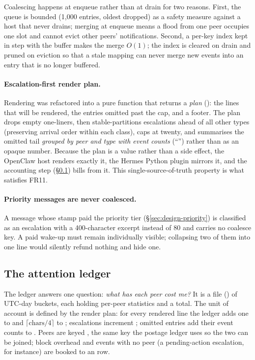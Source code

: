 Coalescing happens at enqueue rather than at drain for two reasons. First, the queue is
bounded (1{,}000 entries, oldest dropped) as a safety measure against a host that never
drains; merging at enqueue means a flood from one peer occupies one slot and cannot evict
other peers' notifications. Second, a per-key index kept in step with the buffer makes
the merge $O(1)$; the index is cleared on drain and pruned on eviction so that a stale
mapping can never merge new events into an entry that is no longer buffered.

\paragraph{Escalation-first render plan.}
Rendering was refactored into a pure function that returns a \emph{plan}
(): the lines that will be rendered, the entries omitted
past the cap, and a footer. The plan drops empty one-liners, then stable-partitions escalations ahead of all
other types (preserving arrival order within each class), caps at twenty, and summarises
the omitted tail \emph{grouped by peer and type with event counts}
(``'') rather than as an opaque
number. Because the plan is a value rather than a side effect, the OpenClaw host renders
exactly it, the Hermes Python plugin mirrors it, and the accounting step
(\S\ref{sec:design-ledger}) bills from it. This single-source-of-truth property is what
satisfies FR11.

\paragraph{Priority messages are never coalesced.}
A message whose stamp paid the priority tier (\S\ref{sec:design-priority}) is classified
as an escalation with a 400-character excerpt instead of 80 and carries no coalesce key.
A paid wake-up must remain individually visible; collapsing two of them into one line
would silently refund nothing and hide one.

\subsection{The attention ledger}
\label{sec:design-ledger}

The ledger answers one question: \emph{what has each peer cost me?} It is a file
() of UTC-day buckets, each holding per-peer
statistics and a total. The unit of account is defined by the render plan: for every
rendered line the ledger adds one to  and
$\lceil \text{chars}/4 \rceil$ to ; escalations increment
; omitted entries add their event counts to
. Peers are keyed , the same key the
postage ledger uses so the two can be joined; block overhead and events with no peer (a
pending-action escalation, for instance) are booked to an  row.

